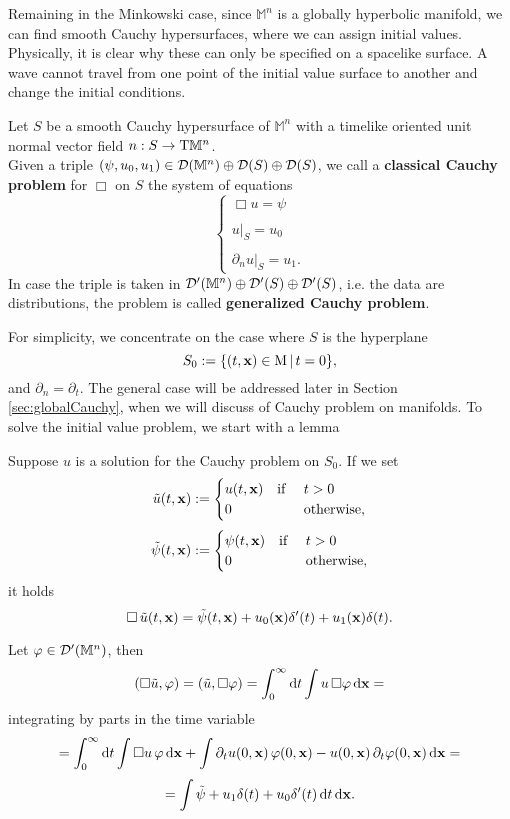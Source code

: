 \noindent Remaining in the Minkowski case, since $\mathbb{M}^n$ is a globally hyperbolic manifold, we can find smooth Cauchy hypersurfaces, where we can assign initial values.\\
Physically, it is clear why these can only be specified on a spacelike surface. A wave cannot travel from one point of the initial value surface to another and change the initial conditions.
\begin{definition}
	Let $S$ be a smooth Cauchy hypersurface of $\mathbb{M}^n$ with a timelike oriented unit normal vector field $n:S\to\mathrm{T}\mathbb{M}^n$.\\ Given a triple $(\psi,u_0,u_1)\in\mathcal{D}(\mathbb{M}^n)\oplus\mathcal{D}(S)\oplus\mathcal{D}(S)$, we call a \textbf{classical Cauchy problem} for $\Box$ on $S$ the system of equations
	\begin{equation}
	\begin{cases}
	\Box u=\psi\\
	\\
	u|_S=u_0\\
	\\
	\partial_n u|_S=u_1.
	\end{cases}
	\end{equation}
	In case the triple is taken in $\mathcal{D}'(\mathbb{M}^n)\oplus\mathcal{D}'(S)\oplus\mathcal{D}'(S)$, i.e. the data are distributions, the problem is called \textbf{generalized Cauchy problem}.
\end{definition}

\noindent For simplicity, we concentrate on the case where $S$ is the hyperplane $$S_0:=\{(t,\mathbf{x})\in\mathrm{M}\,|\, t=0\},$$ and $\partial_n=\partial_t$. The general case will be addressed later in Section \ref{sec:globalCauchy}, when we will discuss of Cauchy problem on manifolds. To solve the initial value problem, we start with a lemma

\begin{lem}
	Suppose $u$ is a solution for the Cauchy problem on $S_0$. If we set 
	\[	\tilde{u}(t,\mathbf{x}):=\begin{cases}
	u(t,\mathbf{x})\quad\text{if }& t>0\\
	0&\text{otherwise},
	\end{cases}			\]
	\[	\tilde{\psi}(t,\mathbf{x}):=\begin{cases}
	\psi(t,\mathbf{x})\quad\text{if }& t>0\\
	0&\text{otherwise},
	\end{cases}			\] it holds
	\begin{equation}
	\Box\, \tilde{u}(t,\mathbf{x})=\tilde{\psi}(t,\mathbf{x})+u_0(\mathbf{x})\delta'(t)+u_1(\mathbf{x})\delta(t).
	\end{equation}
\end{lem}
\Proof Let $\varphi\in\mathcal{D}'(\mathbb{M}^n)$, then
\[(\Box\tilde{u},\varphi)=(\tilde{u},\Box\varphi)=\int_{0}^{\infty}\mathrm d t\int u\,\Box\varphi\,\mathrm d\mathbf{x}= \]
integrating by parts in the time variable
\[=\int_{0}^{\infty}\mathrm d t\int \Box u\,\varphi\,\mathrm d\mathbf{x}+\int \partial_t u(0,\mathbf{x})\,\varphi(0,\mathbf{x})-u(0,\mathbf{x})\,\partial_t \varphi(0,\mathbf{x})\,\mathrm d\mathbf{x}=   \]
\[	=\int \tilde{\psi}+u_1\delta(t)+u_0\delta'(t)\,\mathrm d t\,\mathrm d\mathbf{x}. 			\]\endproof




